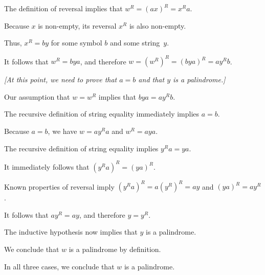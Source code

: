 \documentclass[11pt]{article}
\begin{document}
\begin{solution}
\begin{enumerate}[(a)]
\begin{itemize}
The definition of reversal implies that $w^R = (ax)^R = x^R a$.

Because $x$ is non-empty, its reversal $x^R$ is also non-empty.

Thus, $x^R = by$ for some symbol $b$ and some string~$y$.

It follows that $w^R = bya$, and therefore $w = (w^R)^R = (bya)^R = a y^R b$.


\medskip
\emph{[At this point, we need to prove that $a=b$ and that $y$ is a palindrome.]}
\medskip

Our assumption that $w = w^R$ implies that $bya = a y^R b$.

The recursive definition of string equality immediately implies $a=b$.

\medskip
Because $a=b$, we have $w = ay^Ra$ and $w^R = a y a$.

The recursive definition of string equality implies $y^Ra = ya$.

It immediately follows that $(y^R a)^R = (ya)^R$.

Known properties of reversal imply $(y^R a)^R = a (y^R)^R = ay$ and $(ya)^R = a y^R$.

It follows that $ay^R = ay$, and therefore $y = y^R$.

The inductive hypothesis now implies that $y$ is a palindrome.

\medskip
We conclude that $w$ is a palindrome by definition.
\end{itemize}
In all three cases, we conclude that $w$ is a palindrome.
\end{enumerate}

\end{solution}
\end{document}
